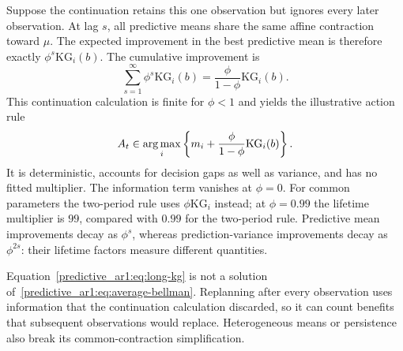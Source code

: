 Suppose the continuation retains this one observation but ignores every later observation. At lag $s$, all predictive means share the same affine contraction toward $\mu$. The expected improvement in the best predictive mean is therefore exactly $\phi^s\mathrm{KG}_i(b)$. The cumulative improvement is
\begin{equation}
\sum_{s=1}^\infty\phi^s\mathrm{KG}_i(b)
=\frac\phi{1-\phi}\mathrm{KG}_i(b).
\end{equation}
This continuation calculation is finite for $\phi<1$ and yields the illustrative action rule
\begin{equation}
A_t\in\operatorname*{arg\,max}_i\left\{m_i+\frac\phi{1-\phi}\mathrm{KG}_i(b)\right\}.
\label{predictive_ar1:eq:long-kg}
\end{equation}
It is deterministic, accounts for decision gaps as well as variance, and has no fitted multiplier. The information term vanishes at $\phi=0$. For common parameters the two-period rule uses $\phi\mathrm{KG}_i$ instead; at $\phi=0.99$ the lifetime multiplier is $99$, compared with $0.99$ for the two-period rule. Predictive mean improvements decay as $\phi^s$, whereas prediction-variance improvements decay as $\phi^{2s}$: their lifetime factors measure different quantities.

Equation~\eqref{predictive_ar1:eq:long-kg} is not a solution of~\eqref{predictive_ar1:eq:average-bellman}. Replanning after every observation uses information that the continuation calculation discarded, so it can count benefits that subsequent observations would replace. Heterogeneous means or persistence also break its common-contraction simplification.


